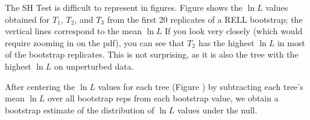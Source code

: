 \documentclass[11pt]{article}
\newcommand{\lnL}{\ln L}
\begin{document}
The SH Test is difficult to represent in figures. 
Figure  shows the $\lnL$ values obtained 
for {\color{blue} $T_1$},  {\color{green} $T_2$}, and  {\color{red} $T_3$} from the first 20 replicates of a RELL bootstrap; the vertical lines correspond to the
mean $\lnL$ 
If you look very closely (which would require zooming in on the pdf), you can see that
{\color{green} $T_2$} has the highest $\lnL$ in most of the bootstrap replicates.
This is not surprising, as it is also the tree with the highest $\lnL$ on unperturbed data.

After centering the $\lnL$ values for each tree (Figure ) by 
subtracting each tree's mean $\lnL$ over all bootstrap reps from each bootstrap value, we obtain a bootstrap estimate of the 
distribution of $\lnL$ values under the null.
\end{document}
